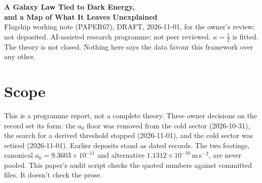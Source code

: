 \documentclass[10pt]{article}
\begin{document}
\begin{center}
{\Large\bfseries A Galaxy Law Tied to Dark Energy,\\ and a Map of What It Leaves Unexplained}\\[6pt]
{\small Flagship working note (PAPER67), DRAFT, 2026-11-01, for the owner's review; not deposited. AI-assisted research programme; not peer reviewed. $\kappa=\tfrac12$ is fitted. The theory is not closed. Nothing here says the data favour this framework over any other.}
\end{center}

\begin{abstract}\noindent
We report what is left of a research programme after its own final grade. A galaxy law, $g_N=g^2/(g+a_0)$ with $a_0=\kappa c\sqrt{G\rho_{\rm DE}}$ and $\kappa=\tfrac12$ fitted, describes isolated disc galaxies well on the canonical footing: SPARC rms 0.0541\,dex at median $\Upsilon$ 0.52, no tilt with speed, no slope with surface brightness at fixed speed. The law is a restatement of MOND's simple form with a proposed origin for its scale. Earlier authors proposed that origin, and the scale's tie to dark energy, as distinct from $cH_0$, has no decisive test yet.

The law fails the Milky Way's vertical force, IC~1613, several Local Group classes, cluster cores and the unscreened Solar System, and at 60--150\,km\,s$^{-1}$ it asks for about twice the stellar mass estimated from photometry. It has no action and supplies no dust-like term for the CMB. To cover those we developed a cold dark energy sector. On measured data all four candidates built on it fail, and the sector is now retired. We publish the scorecard, the two walls that stopped it, and twelve requirements any successor must meet. This is numerical evidence for the families tried, not a no-go theorem. We close with dated tests that can still kill the law.
\end{abstract}

\section{Scope}
This is a programme report, not a complete theory. Three owner decisions on the record set its form: the $a_0$ floor was removed from the cold sector (2026-10-31), the search for a derived threshold stopped (2026-11-01), and the cold sector was retired (2026-11-01). Earlier deposits stand as dated records. The two footings, canonical $a_0=9.3603\times10^{-11}$ and alternative $1.1312\times10^{-10}$\,m\,s$^{-2}$, are never pooled. This paper's audit script checks the quoted numbers against committed files. It doesn't check the prose.
\end{document}

